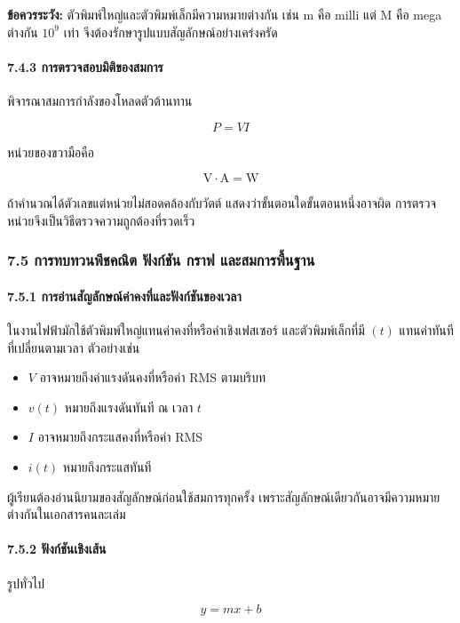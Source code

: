 \textbf{ข้อควรระวัง:} ตัวพิมพ์ใหญ่และตัวพิมพ์เล็กมีความหมายต่างกัน เช่น m คือ milli แต่ M คือ mega ต่างกัน $10^9$ เท่า จึงต้องรักษารูปแบบสัญลักษณ์อย่างเคร่งครัด

\paragraph{7.4.3 การตรวจสอบมิติของสมการ}

พิจารณาสมการกำลังของโหลดตัวต้านทาน

\[
P=VI
\]

หน่วยของขวามือคือ

\[
\mathrm{V}\cdot\mathrm{A}=\mathrm{W}
\]

ถ้าคำนวณได้ตัวเลขแต่หน่วยไม่สอดคล้องกับวัตต์ แสดงว่าขั้นตอนใดขั้นตอนหนึ่งอาจผิด การตรวจหน่วยจึงเป็นวิธีตรวจความถูกต้องที่รวดเร็ว


 

\subsubsection{7.5 การทบทวนพีชคณิต ฟังก์ชัน กราฟ และสมการพื้นฐาน}

\paragraph{7.5.1 การอ่านสัญลักษณ์ค่าคงที่และฟังก์ชันของเวลา}

ในงานไฟฟ้ามักใช้ตัวพิมพ์ใหญ่แทนค่าคงที่หรือค่าเชิงเฟสเซอร์ และตัวพิมพ์เล็กที่มี $(t)$ แทนค่าทันทีที่เปลี่ยนตามเวลา ตัวอย่างเช่น

\begin{itemize}
    \item $V$ อาจหมายถึงค่าแรงดันคงที่หรือค่า RMS ตามบริบท
    \item $v(t)$ หมายถึงแรงดันทันที ณ เวลา $t$
    \item $I$ อาจหมายถึงกระแสคงที่หรือค่า RMS
    \item $i(t)$ หมายถึงกระแสทันที
\end{itemize}

ผู้เรียนต้องอ่านนิยามของสัญลักษณ์ก่อนใช้สมการทุกครั้ง เพราะสัญลักษณ์เดียวกันอาจมีความหมายต่างกันในเอกสารคนละเล่ม

\paragraph{7.5.2 ฟังก์ชันเชิงเส้น}

รูปทั่วไป

\[
y=mx+b
\]

